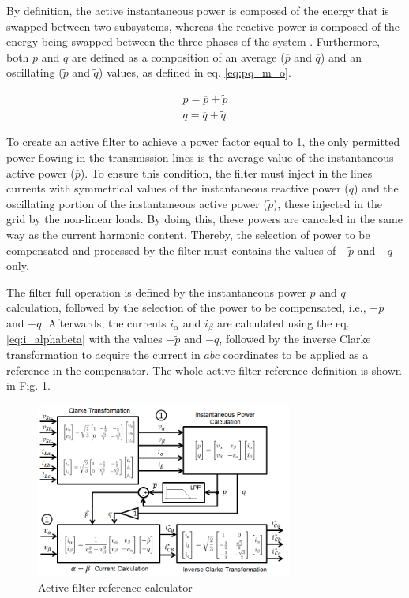 By definition, the active instantaneous power is composed of the energy that is swapped between two subsystems, whereas the reactive power is composed of the energy being swapped between the three phases of the system \citep{Akagi1984,Peng1996}. Furthermore, both $p$ and $q$ are defined as a composition of an average ($\overline{p}$ and $\overline{q}$) and an oscillating ($\tilde{p}$ and $\tilde{q}$) values, as defined in eq. \ref{eq:pq_m_o}.

\begin{equation}
\begin{aligned}
p = \overline{p} + \tilde{p}\\
q = \overline{q} + \tilde{q} 
\end{aligned}
\label{eq:pq_m_o}
\end{equation} 

To create an active filter to achieve a power factor equal to 1, the only permitted power flowing in the transmission lines is the average value of the instantaneous active power ($\overline{p}$). To ensure this condition, the filter must inject in the lines currents with symmetrical values of the instantaneous reactive power ($q$) and the oscillating portion of the instantaneous active power ($\tilde{p}$), these injected in the grid by the non-linear loads. By doing this, these powers are canceled in the same way as the current harmonic content. Thereby, the selection of power to be compensated and processed by the filter must contains the values of $-\tilde{p}$ and $-q$ only.

The filter full operation is defined by the instantaneous power $p$ and $q$ calculation, followed by the selection of the power to be compensated, i.e., $-\tilde{p}$ and $-q$. Afterwards, the currents $i_{\alpha}$ and $i_{\beta}$ are calculated using the eq. \ref{eq:i_alphabeta} with the values $-\tilde{p}$ and $-q$, followed by the inverse Clarke transformation to acquire the current in $abc$ coordinates to be applied as a reference in the compensator. The whole active filter reference definition is shown in Fig. \ref{fig:diagrama_filtro.png}.

\begin{figure}[!th]
	\centering
	\includegraphics[width=0.75\textwidth]{Figures/diagrama_filtro.png}
	\caption{Active filter reference calculator}
	\label{fig:diagrama_filtro.png}
\end{figure}

